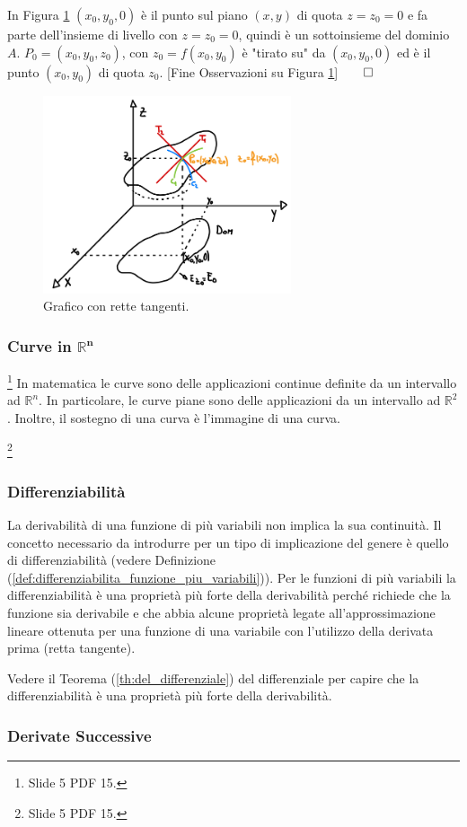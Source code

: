 In Figura \ref{fig:grafico_f_R3_osservazione} $(x_0,y_0,0)$ è il punto sul piano $(x,y)$ di quota $z=z_0=0$ e fa parte dell'insieme di livello con $z=z_0=0$, quindi è un sottoinsieme del dominio $A$. $P_0=(x_0,y_0,z_0)$, con $z_0=f(x_0,y_0)$ è "tirato su" da $(x_0,y_0,0)$ ed è il punto $(x_0,y_0)$ di quota $z_0$. [Fine Osservazioni su Figura \ref{fig:grafico_f_R3_osservazione}]$\qed$
\begin{figure}[ht]
    \centering
    \includegraphics[width=0.65\textwidth]{Analisi2/figures/grafico_f_R3_osservazione.png}
    \caption{Grafico con rette tangenti.}\label{fig:grafico_f_R3_osservazione}
\end{figure}

\subsubsection{Curve in \texorpdfstring{$\boldsymbol{\mathbb R^n}$}{Rn}}\label{ssec:curve_Rn}\footnote{Slide 5 PDF 15.}
In matematica le curve sono delle applicazioni continue definite da un intervallo ad $\mathbb R^n$. In particolare, le curve piane sono delle applicazioni da un intervallo ad $\mathbb R^2$. Inoltre, il sostegno di una curva è l'immagine di una curva.
\begin{definition}
	\footnote{Slide 5 PDF 15.}
\end{definition}

\subsubsection{Differenziabilità}
La derivabilità di una funzione di più variabili non implica la sua continuità. Il concetto necessario da introdurre per un tipo di implicazione del genere è quello di differenziabilità (vedere Definizione (\ref{def:differenziabilita_funzione_piu_variabili})). Per le funzioni di più variabili la differenziabilità è una proprietà più forte della derivabilità perché richiede che la funzione sia derivabile e che abbia alcune proprietà legate all'approssimazione lineare ottenuta per una funzione di una variabile con l'utilizzo della derivata prima (retta tangente).

Vedere il Teorema (\ref{th:del_differenziale}) del differenziale per capire che la differenziabilità è una proprietà più forte della derivabilità.

\subsubsection{Derivate Successive}